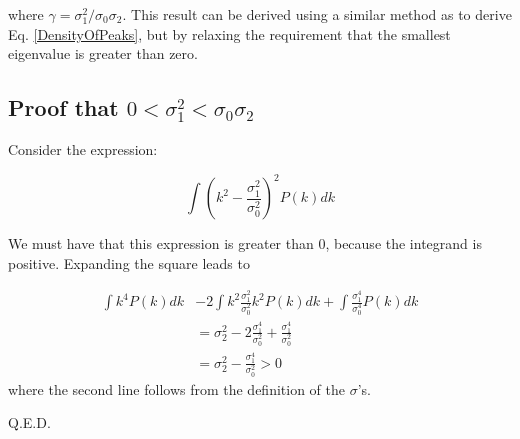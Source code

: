 \documentclass[12pt]{article}
\begin{document}
\noindent where $\gamma = \sigma_1^2/\sigma_0\sigma_2$. This result can be derived using a similar method as to derive Eq. \ref{DensityOfPeaks}, but by relaxing the requirement that the smallest eigenvalue is greater than zero.

\subsection{Proof that $0 < \sigma_1^2 < \sigma_0\sigma_2$} \label{Proof}

Consider the expression:

\begin{equation}
\int (k^2 - \frac{\sigma_1^2}{\sigma_0^2})^2 P(k) dk
\end{equation}

\noindent We must have that this expression is greater than 0, because the integrand is positive. Expanding the square leads to

\begin{equation}
\begin{split}
\int k^4 P(k) dk &- 2 \int k^2 \frac{\sigma_1^2}{\sigma_0^2}k^2 P(k) dk + \int \frac{\sigma_1^4}{\sigma_0^4} P(k) dk \\
&= \sigma_2^2 - 2 \frac{\sigma_1^4}{\sigma_0^2} + \frac{\sigma_1^4}{\sigma_0^2} \\
&= \sigma_2^2 - \frac{\sigma_1^4}{\sigma_0^2} > 0
\end{split}
\end{equation}
where the second line follows from the definition of the $\sigma$'s.

Q.E.D.
\end{document}
